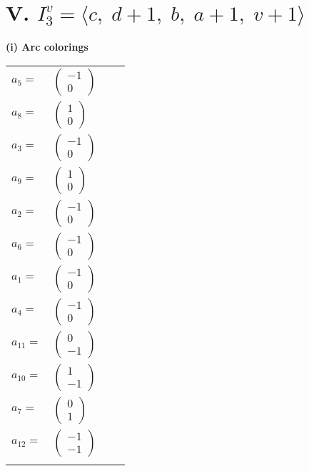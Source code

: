\documentclass[1p]{elsarticle_modified}
\theoremstyle{definition}
\begin{document}
\centering \section*{V. $I^v_{3}= \langle c,\;d+1,\;b,\;a+1,\;v+1 \rangle$}
\flushleft \textbf{(i) Arc colorings}\\
\begin{tabular}{m{7pt} m{180pt} m{7pt} m{180pt} }
\flushright $a_{5}=$&$\begin{pmatrix}-1\\0\end{pmatrix}$ \\
\flushright $a_{8}=$&$\begin{pmatrix}1\\0\end{pmatrix}$ \\
\flushright $a_{3}=$&$\begin{pmatrix}-1\\0\end{pmatrix}$ \\
\flushright $a_{9}=$&$\begin{pmatrix}1\\0\end{pmatrix}$ \\
\flushright $a_{2}=$&$\begin{pmatrix}-1\\0\end{pmatrix}$ \\
\flushright $a_{6}=$&$\begin{pmatrix}-1\\0\end{pmatrix}$ \\
\flushright $a_{1}=$&$\begin{pmatrix}-1\\0\end{pmatrix}$ \\
\flushright $a_{4}=$&$\begin{pmatrix}-1\\0\end{pmatrix}$ \\
\flushright $a_{11}=$&$\begin{pmatrix}0\\-1\end{pmatrix}$ \\
\flushright $a_{10}=$&$\begin{pmatrix}1\\-1\end{pmatrix}$ \\
\flushright $a_{7}=$&$\begin{pmatrix}0\\1\end{pmatrix}$ \\
\flushright $a_{12}=$&$\begin{pmatrix}-1\\-1\end{pmatrix}$\\&\end{tabular}
\end{document}
